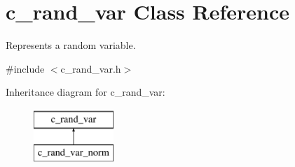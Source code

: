 \hypertarget{classc__rand__var}{\section{c\-\_\-rand\-\_\-var \-Class \-Reference}
\label{classc__rand__var}
}


\-Represents a random variable.  




{\ttfamily \#include $<$c\-\_\-rand\-\_\-var.\-h$>$}

\-Inheritance diagram for c\-\_\-rand\-\_\-var\-:\begin{figure}[H]
\begin{center}
\leavevmode
\includegraphics[height=2.000000cm]{classc__rand__var}
\end{center}
\end{figure}
